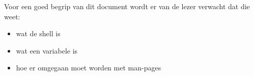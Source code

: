 Voor een goed begrip van dit document wordt er van de lezer verwacht dat die weet:
\begin{itemize}
\item wat de shell is
\item wat een variabele is
\item hoe er omgegaan moet worden met man-pages
\end{itemize}
